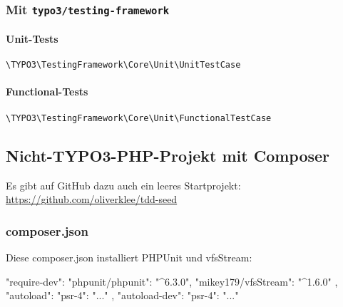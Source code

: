 \documentclass[a4paper,11pt,headsepline]{scrartcl}
\begin{document}
\subsubsection{Mit \texttt{typo3/testing-framework}}

\paragraph{Unit-Tests}
\texttt{\textbackslash TYPO3\textbackslash TestingFramework\textbackslash Core\textbackslash Unit\textbackslash UnitTestCase}

\paragraph{Functional-Tests}
\texttt{\textbackslash TYPO3\textbackslash TestingFramework\textbackslash Core\textbackslash Unit\textbackslash FunctionalTestCase}


\subsection{Nicht-TYPO3-PHP-Projekt mit Composer}

Es gibt auf GitHub dazu auch ein leeres Startprojekt:\\
\url{https://github.com/oliverklee/tdd-seed}

\subsubsection{composer.json}

Diese composer.json installiert PHPUnit und vfsStream:

\begin{jsoncode}
{
    "require-dev": {
        "phpunit/phpunit": "^6.3.0",
        "mikey179/vfsStream": "^1.6.0"
    },
    "autoload": {
        "psr-4": {
            "..."
        }
    },
    "autoload-dev": {
        "psr-4": {
            "..."
        }
    }
}
\end{jsoncode}
\end{document}
